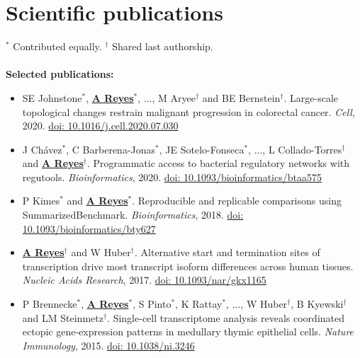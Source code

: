 \documentclass[11pt,a4paper,sans]{moderncv} %
\begin{document}
\section{Scientific publications}
\vspace{-.1cm}
\footnotesize{$^{\ast}$ Contributed equally.} \hspace{.5cm}
\footnotesize{$^{\dagger}$ Shared last authorship.} \\
\\
\vspace{-.1cm}
\textbf{Selected publications:}
\begin{itemize}
\item SE Johnstone$^{\ast}$, \textbf{\underline{A Reyes}}$^{\ast}$,
  ..., M Aryee$^{\dagger}$ and BE Bernstein$^{\dagger}$. Large-scale topological changes restrain malignant progression in colorectal cancer. \textit{Cell}, 2020. \href{https://doi.org/10.1016/j.cell.2020.07.030}{doi: 10.1016/j.cell.2020.07.030}
\item J Ch\'avez$^{\ast}$, C Barberena-Jonas$^{\ast}$, JE Sotelo-Fonseca$^{\ast}$, ..., L Collado-Torres$^{\dagger}$ and \textbf{\underline{A Reyes}}$^{\dagger}$. Programmatic access to bacterial regulatory networks with regutools. \textit{Bioinformatics}, 2020. \href{https://doi.org/10.1093/bioinformatics/btaa575}{doi: 10.1093/bioinformatics/btaa575}
\item P Kimes$^{\ast}$ and \textbf{\underline{A Reyes}}$^{\ast}$. Reproducible and replicable comparisons using SummarizedBenchmark. \textit{Bioinformatics}, 2018. \href{https://doi.org/10.1093/bioinformatics/bty627}{doi: 10.1093/bioinformatics/bty627}
\item \textbf{\underline{A Reyes}}$^{\dagger}$ and W Huber$^{\dagger}$. Alternative start and termination sites of transcription drive most transcript isoform differences across human tissues. \textit{Nucleic Acids Research}, 2017. \href{https://doi.org/10.1093/nar/gkx1165}{doi: 10.1093/nar/gkx1165}
\item P Brennecke$^{\ast}$, \textbf{\underline{A Reyes}}$^{\ast}$, S Pinto$^{\ast}$, K Rattay$^{\ast}$, ..., W Huber$^{\dagger}$, B Kyewski$^{\dagger}$ and LM Steinmetz$^{\dagger}$. Single-cell transcriptome analysis reveals coordinated ectopic gene-expression patterns in medullary thymic epithelial cells. \textit{Nature Immunology}, 2015. \href{https://doi.org/10.1038/ni.3246}{doi: 10.1038/ni.3246}

\end{itemize}
\end{document}
